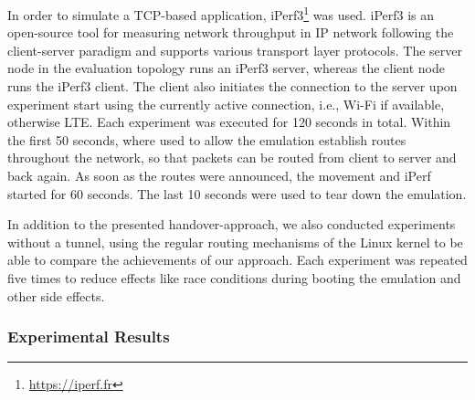 In order to simulate a TCP-based application, iPerf3\footnote{\url{https://iperf.fr}} was used.
iPerf3 is an open-source tool for measuring network throughput in IP network following the client-server paradigm and supports various transport layer protocols.
The server node in the evaluation topology runs an iPerf3 server, whereas the client node runs the iPerf3 client.
The client also initiates the connection to the server upon experiment start using the currently active connection, i.e., Wi-Fi if available, otherwise LTE.
Each experiment was executed for 120 seconds in total.
Within the first 50 seconds, where used to allow the emulation establish routes throughout the network, so that packets can be routed from client to server and back again.
As soon as the routes were announced, the movement and iPerf started for 60 seconds.
The last 10 seconds were used to tear down the emulation.

In addition to the presented handover-approach, we also conducted experiments without a tunnel, using the regular routing mechanisms of the Linux kernel to be able to compare the achievements of our approach.
Each experiment was repeated five times to reduce effects like race conditions during booting the emulation and other side effects.

\subsubsection{Experimental Results}

